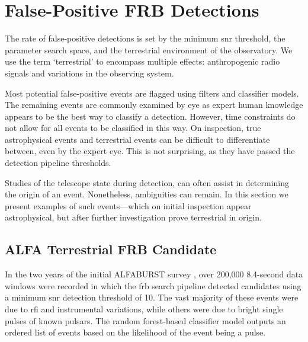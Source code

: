 \documentclass[a4paper,fleqn,usenatbib]{mnras}
\begin{document}
\section{False-Positive FRB Detections}
\label{sec:false-pos}

The rate of false-positive detections is set by the minimum \gls{snr} threshold,
the parameter search space, and the terrestrial environment of the observatory.
We use the term `terrestrial' to encompass multiple effects: anthropogenic radio
signals and variations in the observing system.

Most potential false-positive events are flagged using filters and classifier
models.  The remaining events are commonly examined by eye as expert human
knowledge appears to be the best way to classify a detection. However, time
constraints do not allow for all events to be classified in this way. On
inspection, true astrophysical events and terrestrial events can be difficult to
differentiate between, even by the expert eye.  This is not surprising, as they
have passed the detection pipeline thresholds.

Studies of the telescope state during detection, can often assist in determining
the origin of an event. Nonetheless, ambiguities can remain.  In this section we
present examples of such events---which on initial inspection appear
astrophysical, but after further investigation prove terrestrial in origin.

\subsection{ALFA Terrestrial FRB Candidate}
\label{sec:D20161204}

In the two years of the initial ALFABURST survey \citep{2017ApJS..228...21C,
2018MNRAS.474.3847F}, over 200,000 8.4-second data windows were recorded in which
the \gls{frb} search pipeline detected candidates using a minimum \gls{snr}
detection threshold of 10. The vast majority of these events were due to
\gls{rfi} and instrumental variations, while others were due to bright single
pulses of known pulsars.  The random forest-based classifier model outputs an
ordered list of events based on the likelihood of the event being a pulse.
\end{document}
